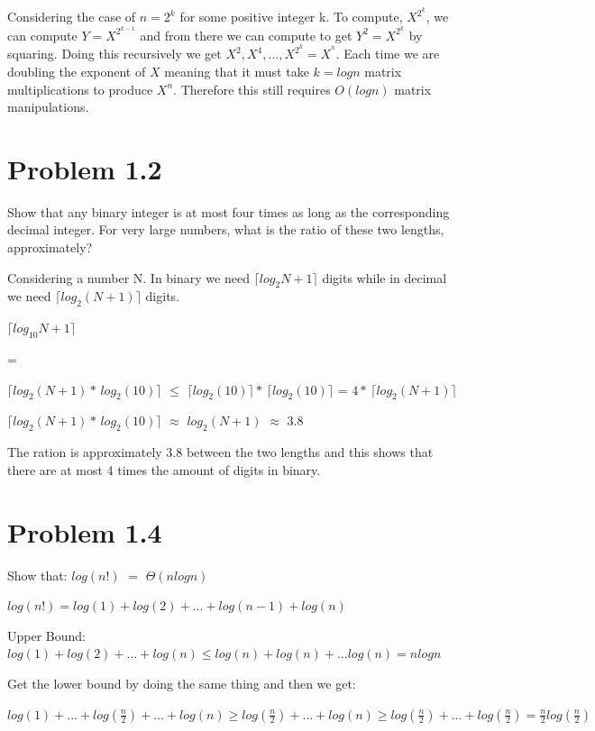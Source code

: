 \documentclass{article}
\begin{document}
Considering the case of $n = 2^{k}$ for some positive integer k. To compute, $X^{2^{k}}$, we can compute $Y = X^{2^{k-1}}$ and from there we can compute to get $Y^{2} = X^{2^{k}}$ by squaring. Doing this recursively we get $X^{2}, X^{4},...,X^{2^{k}} = X^{^{n}}$. Each time we are doubling the exponent of $X$ meaning that it must take $k = logn$ matrix multiplications to produce $X^{n}$. Therefore this still requires $O(logn)$ matrix manipulations. 

\section{Problem 1.2}
Show that any binary integer is at most four times as long as the corresponding decimal integer.
For very large numbers, what is the ratio of these two lengths, approximately?
\vspace{2mm}

Considering a number N. In binary we need $\lceil log_{2}N+1 \rceil$ digits while in decimal we need $\lceil log_{2}(N+1) \rceil$ digits.

\begin{center}
$\lceil log_{10}N+1 \rceil$

=

$\lceil log_{2}(N+1) *\, log_{2}(10) \rceil$ $\leq$ $\lceil log_{2}(10) \rceil *\, \lceil log_{2}(10) \rceil$ = $4 *\, \lceil log_{2}(N+1)\rceil$

$\lceil log_{2}(N+1) *\, log_{2}(10) \rceil$ $\approx$ $log_{2}(N+1)$ $\approx$ $3.8$
\end{center}

The ration is approximately 3.8 between the two lengths and this shows that there are at most 4 times the amount of digits in binary.

\section{Problem 1.4}
Show that: $log(n!)$ $=$ $\Theta(nlogn)$
\vspace{2mm}

\begin{center}
$log(n!) = log(1) + log(2) + ... + log(n-1) + log(n)$

Upper Bound: $log(1) + log(2) + ... + log(n) \leq log(n) + log(n) + ... log(n) = nlogn$

Get the lower bound by doing the same thing and then we get:

$log(1) + ... + log(\frac{n}{2}) + ... + log(n) \geq log(\frac{n}{2}) + ... + log(n) \geq log(\frac{n}{2}) + ... + log(\frac{n}{2}) = \frac{n}{2} log(\frac{n}{2})$
\end{center}
\end{document}
